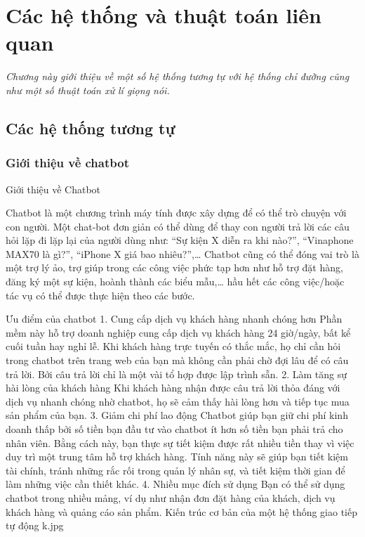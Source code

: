 \chapter{Các hệ thống và thuật toán liên quan}
\label{Chapter2}

\emph{Chương này giới thiệu về một số hệ thống tương tự với hệ thống chỉ đường cũng như một số thuật toán xử lí giọng nói.}

\section{Các hệ thống tương tự}

\subsection{Giới thiệu về chatbot}
Giới thiệu về Chatbot

Chatbot là một chương trình máy tính được xây dựng để có thể trò chuyện với con người. Một chat-bot đơn giản có thể dùng để thay con người trả lời các câu hỏi lặp đi lặp lại của người dùng như: “Sự kiện X diễn ra khi nào?”, “Vinaphone MAX70 là gì?”, “iPhone X giá bao nhiêu?”,… Chatbot cũng có thể đóng vai trò là một trợ lý ảo, trợ giúp trong các công việc phức tạp hơn như hỗ trợ đặt hàng, đăng ký một sự kiện, hoành thành các biểu mẫu,… hầu hết các công việc/hoặc tác vụ có thể được thực hiện theo các bước.

Ưu điểm của chatbot
1. Cung cấp dịch vụ khách hàng nhanh chóng hơn
Phần mềm này hỗ trợ doanh nghiệp cung cấp dịch vụ khách hàng 24 giờ/ngày, bất kể cuối tuần hay nghỉ lễ.
Khi khách hàng trực tuyến có thắc mắc, họ chỉ cần hỏi trong chatbot trên trang web của bạn mà không cần phải chờ đợi lâu để có câu trả lời. Bởi câu trả lời chỉ là một vài tổ hợp được lập trình sẵn.
2. Làm tăng sự hài lòng của khách hàng
Khi khách hàng nhận được câu trả lời thỏa đáng với dịch vụ nhanh chóng nhờ chatbot, họ sẽ cảm thấy hài lòng hơn và tiếp tục mua sản phẩm của bạn.
3. Giảm chi phí lao động
Chatbot giúp bạn giữ chi phí kinh doanh thấp bởi số tiền bạn đầu tư vào chatbot ít hơn số tiền bạn phải trả cho nhân viên.
Bằng cách này, bạn thực sự tiết kiệm được rất nhiều tiền thay vì việc duy trì một trung tâm hỗ trợ khách hàng. Tính năng này sẽ giúp bạn tiết kiệm tài chính, tránh những rắc rối trong quản lý nhân sự, và tiết kiệm thời gian để làm những việc cần thiết khác.
4. Nhiều mục đích sử dụng
Bạn có thể sử dụng chatbot trong nhiều mảng, ví dụ như nhận đơn đặt hàng của khách, dịch vụ khách hàng và quảng cáo sản phẩm.
Kiến trúc cơ bản của một hệ thống giao tiếp tự động
k.jpg

